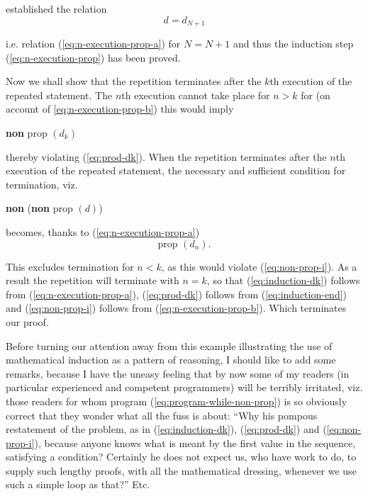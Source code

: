 \noindent
established the relation
$$
d = d_{N + 1}
$$

\noindent
i.e. relation (\ref{eq:n-execution-prop-a}) for $N = N + 1$ and thus the induction step (\ref{eq:n-execution-prop}) has been
proved.

Now we shall show that the repetition terminates after the $k$th execution of the repeated statement. The $n$th execution cannot take place for $n > k$
for (on account of \ref{eq:n-execution-prop-b}) this would imply
\begin{center}
	\textbf{non} prop $(d_k)$
\end{center}

\noindent 
thereby violating (\ref{eq:prod-dk}). When the repetition terminates after the $n$th execution of the repeated statement, the necessary and sufficient condition for termination, viz.
\begin{center}
	\textbf{non} (\textbf{non} prop $(d)$)
\end{center}

\noindent
becomes, thanks to (\ref{eq:n-execution-prop-a})
\begin{equation}
	\label{eq:induction-end}
\text{prop } (d_n).
\end{equation}

This excludes termination for $n < k$, as this would violate (\ref{eq:non-prop-i}). As a result the repetition will terminate with $n = k$, so that (\ref{eq:induction-dk}) follows from (\ref{eq:n-execution-prop-a}), (\ref{eq:prod-dk}) follows from (\ref{eq:induction-end}) and (\ref{eq:non-prop-i}) follows from (\ref{eq:n-execution-prop-b}). Which terminates our proof.

Before turning our attention away from this example illustrating the use of mathematical induction as a pattern of reasoning, I should like to add some remarks, because I have the uneasy feeling that by now some of my readers (in particular experienced and competent programmers) will be terribly irritated, viz. those readers for whom program (\ref{eq:program-while-non-prop}) is so obviously correct that they wonder what all the fuss is about: ``Why his pompous restatement of the problem, as in (\ref{eq:induction-dk}), (\ref{eq:prod-dk}) and (\ref{eq:non-prop-i}), because anyone knows what is meant by the first value in the sequence, satisfying a condition? Certainly he does not expect us, who have work to do, to supply such lengthy proofs, with all the mathematical dressing, whenever we use such a simple loop as that?'' Etc.

